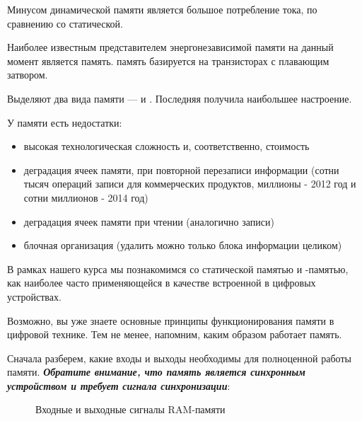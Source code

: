 \par{Минусом динамической памяти является большое потребление тока, по сравнению со статической.}

\vspace{4mm}

\par{Наиболее известным представителем энергонезависимой памяти на данный момент является  память.  память базируется на транзисторах с плавающим затвором.}

\par{Выделяют два вида  памяти —  и . Последняя получила наибольшее настроение.}

\par{У  памяти есть недостатки:}
  \begin{itemize}[noitemsep,topsep=0pt, after=\vspace{2pt}]
    \item высокая технологическая сложность и, соответственно, стоимость
    \item деградация ячеек памяти, при повторной перезаписи информации  (сотни тысяч операций записи для коммерческих продуктов, миллионы - 2012 год и сотни миллионов - 2014 год)
    \item деградация ячеек памяти при чтении (аналогично записи)
    \item блочная организация (удалить можно только блока информации целиком)
  \end{itemize}

\par{В рамках нашего курса мы познакомимся со статической памятью и -памятью, как наиболее часто применяющейся в качестве встроенной в цифровых устройствах.}

\par{Возможно, вы уже знаете основные принципы функционирования памяти в цифровой технике. Тем не менее, напомним, каким образом работает  память.}

\par{Сначала разберем, какие входы и выходы необходимы для полноценной работы памяти. \textbf{\textit{Обратите внимание, что память является синхронным устройством и требует сигнала синхронизации}}:}

\begin{figure}[H]
	\centering
	\def\svgwidth{\columnwidth}
	
	\caption{Входные и выходные сигналы RAM-памяти}
\end{figure}

